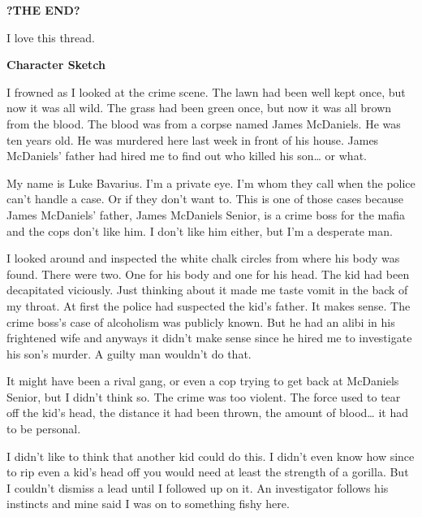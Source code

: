 {\bf ?THE END?} 
 





I love this thread.



{\bf Character Sketch}



I frowned as I looked at the crime scene. The lawn had been well
kept once, but now it was all wild. The grass had been green once,
but now it was all brown from the blood. The blood was from a
corpse named James McDaniels. He was ten years old. He was murdered
here last week in front of his house. James McDaniels' father
had hired me to find out who killed his son{\ldots} or what.



My name is Luke Bavarius. I'm a private eye. I'm whom
they call when the police can't handle a case. Or if they
don't want to. This is one of those cases because James
McDaniels' father, James McDaniels Senior, is a crime boss
for the mafia and the cops don't like him. I don't like
him either, but I'm a desperate man.



I looked around and inspected the white chalk circles from where
his body was found. There were two. One for his body and one for
his head. The kid had been decapitated viciously. Just thinking
about it made me taste vomit in the back of my throat. At first the
police had suspected the kid's father. It makes sense. The
crime boss's case of alcoholism was publicly known. But he
had an alibi in his frightened wife and anyways it didn't
make sense since he hired me to investigate his son's murder.
A guilty man wouldn't do that.



It might have been a rival gang, or even a cop trying to get back
at McDaniels Senior, but I didn't think so. The crime was too
violent. The force used to tear off the kid's head, the
distance it had been thrown, the amount of blood{\ldots} it had to
be personal.



I didn't like to think that another kid could do this. I
didn't even know how since to rip even a kid's head off
you would need at least the strength of a gorilla. But I
couldn't dismiss a lead until I followed up on it. An
investigator follows his instincts and mine said I was on to
something fishy here.



